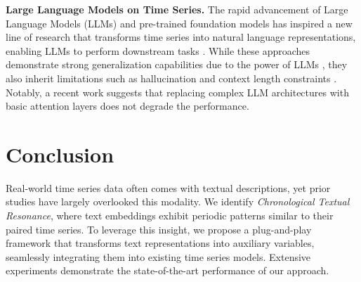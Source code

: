 \textbf{Large Language Models on Time Series.}
The rapid advancement of Large Language Models (LLMs) and pre-trained foundation models \cite{jing2024automated, DBLP:journals/corr/abs-2410-12126, DBLP:journals/corr/abs-2412-21151} has inspired a new line of research that transforms time series into natural language representations, enabling LLMs to perform downstream tasks \cite{DBLP:conf/emnlp/SuiZZHDH024, DBLP:conf/ijcai/0001C0S24}. While these approaches demonstrate strong generalization capabilities due to the power of LLMs \cite{DBLP:conf/nips/GruverFQW23, DBLP:conf/iclr/CaoJAPZY024, DBLP:conf/iclr/0005WMCZSCLLPW24, DBLP:journals/tkde/XueS24}, they also inherit limitations such as hallucination \cite{DBLP:journals/corr/abs-2311-05232, DBLP:conf/emnlp/ZouZLH024} and context length constraints \cite{DBLP:conf/ijcai/WangSORRE24, DBLP:journals/tacl/LiuLHPBPL24}. Notably, a recent work \cite{DBLP:journals/corr/abs-2406-16964} suggests that replacing complex LLM architectures with basic attention layers does not degrade the performance.



\section{Conclusion}
Real-world time series data often comes with textual descriptions, yet prior studies have largely overlooked this modality. We identify \textit{Chronological Textual Resonance}, where text embeddings exhibit periodic patterns similar to their paired time series.
To leverage this insight, we propose a plug-and-play framework that transforms text representations into auxiliary variables, seamlessly integrating them into existing time series models.
Extensive experiments demonstrate the state-of-the-art performance of our approach.